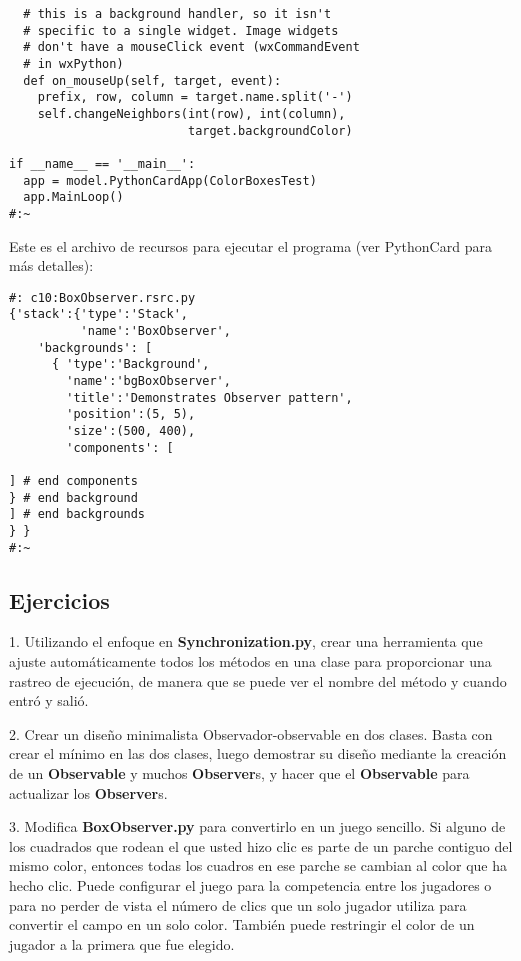 \begin{lstlisting}
  # this is a background handler, so it isn't   
  # specific to a single widget. Image widgets  
  # don't have a mouseClick event (wxCommandEvent 
  # in wxPython) 
  def on_mouseUp(self, target, event): 
    prefix, row, column = target.name.split('-') 
    self.changeNeighbors(int(row), int(column),  
                         target.backgroundColor) 
                         
if __name__ == '__main__': 
  app = model.PythonCardApp(ColorBoxesTest) 
  app.MainLoop() 
#:~ 
\end{lstlisting}

Este es el archivo de recursos para ejecutar el programa (ver PythonCard para más detalles):  \newline

\begin{lstlisting} 
#: c10:BoxObserver.rsrc.py 
{'stack':{'type':'Stack', 
          'name':'BoxObserver', 
    'backgrounds': [ 
      { 'type':'Background', 
        'name':'bgBoxObserver', 
        'title':'Demonstrates Observer pattern', 
        'position':(5, 5), 
        'size':(500, 400), 
        'components': [ 
        
] # end components 
} # end background 
] # end backgrounds 
} } 
#:~ 
\end{lstlisting}


\subsection*{Ejercicios}
\label{subsec:Ejercicios12}


1. Utilizando el enfoque en  \textbf{Synchronization.py}, crear una herramienta que ajuste automáticamente todos los métodos en una clase para proporcionar una rastreo de ejecución, de manera que se puede ver el nombre del método y cuando entró y salió. \newline

2. Crear un diseño minimalista Observador-observable en dos clases. Basta con crear el mínimo en las dos clases, luego demostrar su diseño mediante la creación de un \textbf{Observable} y muchos \textbf{Observer}s, y hacer que el \textbf{Observable} para actualizar los \textbf{Observer}s.   \newline

3. Modifica \textbf{BoxObserver.py} para convertirlo en un juego sencillo. Si alguno de los cuadrados que rodean el que usted hizo clic es parte de un parche contiguo del mismo color, entonces todas los cuadros en ese parche se cambian al color que ha hecho clic. Puede configurar el juego para la competencia entre los jugadores o para no perder de vista el número de clics que un solo jugador utiliza para convertir el campo en un solo color. También puede restringir el color de un jugador a la primera que fue elegido. \newline